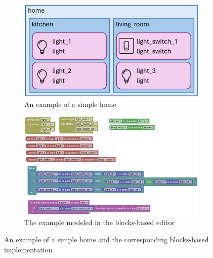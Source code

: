 \documentclass[11pt,a4paper]{report}
\begin{document}
\begin{figure}[htbp]
    \centering
    \begin{subfigure}[b]{0.6\linewidth}
        \centering
        \includegraphics[width=\linewidth]{images/custom_blocks_example.png}
        \caption{An example of a simple home}
        \label{fig:custom_blocks_example}
    \end{subfigure}
    \hfill
    \begin{subfigure}[b]{1\linewidth}
        \centering
        \includegraphics[width=\linewidth]{images/homy_example.png}
        \caption{The example modeled in the blocks-based editor}
        \label{fig:homy_example}
    \end{subfigure}
    \caption{An example of a simple home and the corresponding blocks-based implementation}
    \label{fig:homy_example_combined} 
\end{figure}
\end{document}
